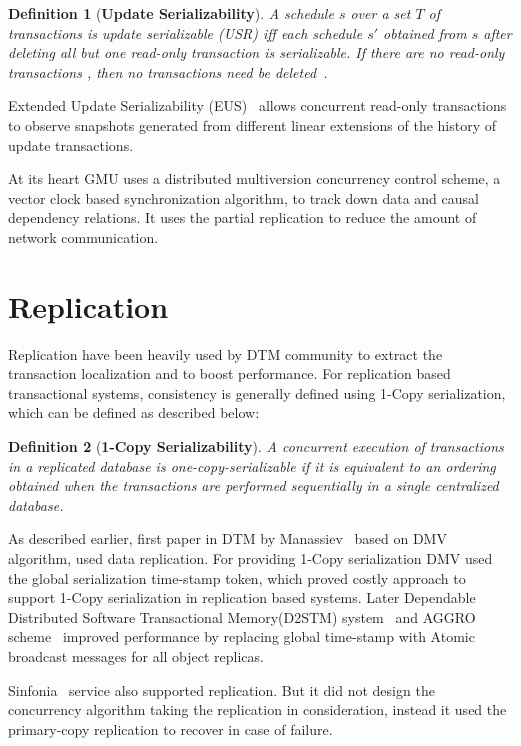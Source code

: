 \documentclass[12pt,english]{report}
\newtheorem{definition}{Definition}[section]
\begin{document}
\begin{definition}[\textbf{Update Serializability}]
A schedule $s$ over a set $T$ of transactions is update serializable (USR) iff each schedule $s'$ obtained from $s$ after deleting all but one read-only transaction is serializable. If there are no read-only transactions , then no transactions need be deleted~\cite{UpdateSerializability1986}.
\end{definition}

Extended Update Serializability (EUS)~\cite{EUS:HansdahPatnaik} allows concurrent read-only transactions to observe snapshots generated from different linear extensions of the history of update transactions.

At its heart GMU uses a distributed multiversion concurrency control scheme, a vector clock based synchronization algorithm, to track down data and causal dependency relations. It uses the partial replication to reduce the amount of network communication. 


\section{Replication}
Replication have been heavily used by DTM community to extract the transaction localization and to boost performance. For replication based transactional systems, consistency is generally defined using 1-Copy serialization, which can be defined as described below:

\begin{definition}[\textbf{1-Copy Serializability}]
A concurrent execution of transactions in a replicated database is one-copy-serializable if it is equivalent  to an ordering obtained when the transactions are performed sequentially in a single centralized database.~\cite{bornea2011one}
\end{definition}

As described earlier, first paper in DTM by Manassiev~\cite{Manassiev:2006:EDV:1122971.1123002} based on DMV algorithm, used data replication. For providing 1-Copy serialization DMV used the global serialization time-stamp token, which proved costly approach to support 1-Copy serialization in replication based systems. Later Dependable Distributed Software Transactional Memory(D2STM) system~\cite{D2STM:5368778} and AGGRO scheme~\cite{AGGRO:5598236} improved performance by replacing global time-stamp with Atomic broadcast messages for all object replicas.  

Sinfonia~\cite{Aguilera:2009:SNP:1629087.1629088} service also supported replication. But it did not design the concurrency algorithm taking the replication in consideration, instead it used the primary-copy replication to recover in case of failure. 
\end{document}
